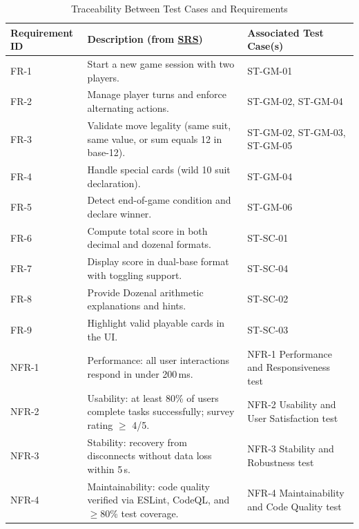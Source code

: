 \documentclass[12pt, titlepage]{article}
\begin{document}
\begin{table}[H]
    \centering
    \caption{Traceability Between Test Cases and Requirements}
    \label{TblTraceability}
    \begin{tabular}{|p{}|p{}|p{}|}
        \hline
        \textbf{Requirement ID} & \textbf{Description (from \href{../SRS/SRS.pdf}{SRS})} & \textbf{Associated Test Case(s)} \\ \hline

        FR-1 & Start a new game session with two players. & ST-GM-01 \\ \hline
        FR-2 & Manage player turns and enforce alternating actions. & ST-GM-02, ST-GM-04 \\ \hline
        FR-3 & Validate move legality (same suit, same value, or sum equals 12 in base-12). & ST-GM-02, ST-GM-03, ST-GM-05 \\ \hline
        FR-4 & Handle special cards (wild 10 suit declaration). & ST-GM-04 \\ \hline
        FR-5 & Detect end-of-game condition and declare winner. & ST-GM-06 \\ \hline
        FR-6 & Compute total score in both decimal and dozenal formats. & ST-SC-01 \\ \hline
        FR-7 & Display score in dual-base format with toggling support. & ST-SC-04 \\ \hline
        FR-8 & Provide Dozenal arithmetic explanations and hints. & ST-SC-02 \\ \hline
        FR-9 & Highlight valid playable cards in the UI. & ST-SC-03 \\ \hline

        NFR-1 & Performance: all user interactions respond in under 200\,ms. & NFR-1 Performance and Responsiveness test \\ \hline
        NFR-2 & Usability: at least 80\% of users complete tasks successfully; survey rating $\geq$ 4/5. & NFR-2 Usability and User Satisfaction test \\ \hline
        NFR-3 & Stability: recovery from disconnects without data loss within 5\,s. & NFR-3 Stability and Robustness test \\ \hline
        NFR-4 & Maintainability: code quality verified via ESLint, CodeQL, and $\geq$80\% test coverage. & NFR-4 Maintainability and Code Quality test \\ \hline

    \end{tabular}
\end{table}
\end{document}
